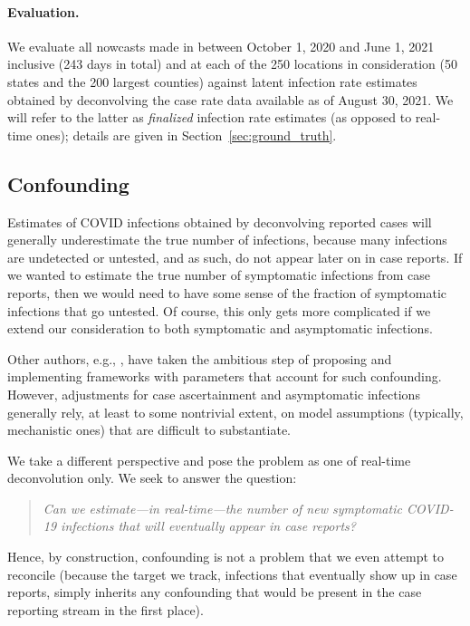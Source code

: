 \documentclass[sts]{imsart}
\theoremstyle{plain}
\theoremstyle{definition}
\theoremstyle{remark}
\begin{document}
\smallskip
\paragraph*{Evaluation.}

We evaluate all nowcasts made in between October 1, 2020 and June 1, 2021
inclusive (243 days in total) and at each of the 250 locations in consideration 
(50 states and the 200 largest counties) against latent infection rate estimates 
obtained by deconvolving the case rate data available as of August 30, 2021. 
We will refer to the latter as \emph{finalized} infection rate estimates (as 
opposed to real-time ones); details are given in Section~\ref{sec:ground_truth}. 

\subsection{Confounding}
\label{sec:confounding}

Estimates of COVID infections obtained by deconvolving reported cases will
generally underestimate the true number of infections, because many infections
are undetected or untested, and as such, do not appear later on in case
reports. If we wanted to estimate the true number of symptomatic infections
from case reports, then we would need to have some sense of the fraction of 
symptomatic infections that go untested. Of course, this only gets more
complicated if we extend our consideration to both symptomatic and asymptomatic
infections.  

Other authors, e.g., \citet{Chitwood:2021}, have taken the ambitious step of
proposing and implementing frameworks with parameters that account for such
confounding. However, adjustments for case ascertainment and asymptomatic
infections generally rely, at least to some nontrivial extent, on model
assumptions (typically, mechanistic ones) that are difficult to substantiate.

We take a different perspective and pose the problem as one of real-time 
deconvolution only. We seek to answer the question:   
\begin{quote}
\it
Can we estimate---in real-time---the number of new symptomatic COVID-19
infections that will eventually appear in case reports?  
\end{quote}
Hence, by construction, confounding is not a problem that we even attempt   
to reconcile (because the target we track, infections that eventually show up
in case reports, simply inherits any confounding that would be present in the
case reporting stream in the first place). 
\end{document}
